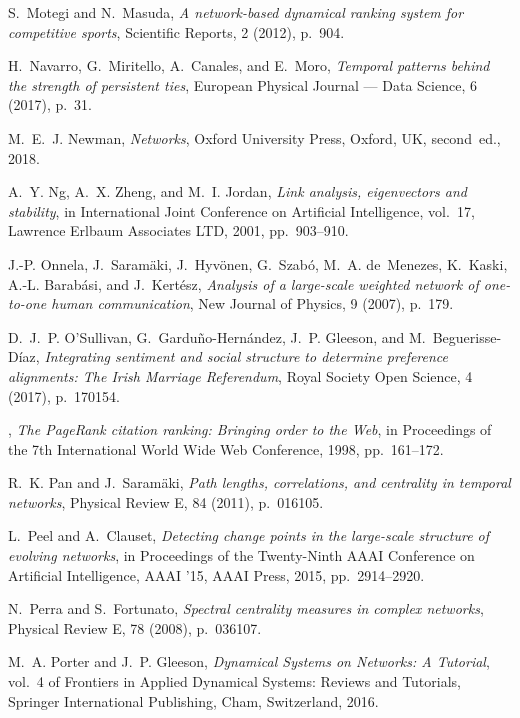\documentclass[journal,transmag]{IEEEtran}
\begin{document}
\begin{thebibliography}{10}
{\sc S.~Motegi and N.~Masuda}, {\em A network-based dynamical ranking system
  for competitive sports}, Scientific Reports, 2 (2012), p.~904.

{\sc H.~Navarro, G.~Miritello, A.~Canales, and E.~Moro}, {\em Temporal patterns
  behind the strength of persistent ties}, European Physical Journal --- Data
  Science, 6 (2017), p.~31.

{\sc M.~E.~J. Newman}, {\em Networks}, {Oxford University Press}, Oxford, UK,
  second~ed., 2018.

{\sc A.~Y. Ng, A.~X. Zheng, and M.~I. Jordan}, {\em Link analysis, eigenvectors
  and stability}, in International Joint Conference on Artificial Intelligence,
  vol.~17, Lawrence Erlbaum Associates LTD, 2001, pp.~903--910.

{\sc J.-P. Onnela, J.~Saram\"aki, J.~Hyv\"onen, G.~Szab\'o, M.~A. de~Menezes,
  K.~Kaski, A.-L. Barab\'asi, and J.~Kert\'esz}, {\em Analysis of a large-scale
  weighted network of one-to-one human communication}, New Journal of Physics,
  9 (2007), p.~179.

{\sc D.~J.~P. {O'Sullivan}, G.~{Gardu{\~n}o-Hern{\'a}ndez}, J.~P. {Gleeson},
  and M.~Beguerisse-D\'iaz}, {\em {Integrating sentiment and social structure
  to determine preference alignments: The Irish Marriage Referendum}}, Royal
  Society Open Science, 4 (2017), p.~170154.

{}, {\em The
  {PageRank} citation ranking: {B}ringing order to the {W}eb}, in Proceedings
  of the 7th International World Wide Web Conference, 1998, pp.~161--172.

{\sc R.~K. Pan and J.~Saram\"aki}, {\em Path lengths, correlations, and
  centrality in temporal networks}, Physical Review E, 84 (2011), p.~016105.

{\sc L.~Peel and A.~Clauset}, {\em Detecting change points in the large-scale
  structure of evolving networks}, in Proceedings of the Twenty-Ninth AAAI
  Conference on Artificial Intelligence, AAAI '15, AAAI Press, 2015,
  pp.~2914--2920.

{\sc N.~Perra and S.~Fortunato}, {\em Spectral centrality measures in complex
  networks}, Physical Review E, 78 (2008), p.~036107.

{\sc M.~A. Porter and J.~P. Gleeson}, {\em {Dynamical Systems on Networks: {A}
  Tutorial}}, vol.~4 of Frontiers in Applied Dynamical Systems: Reviews and
  Tutorials, Springer International Publishing, Cham, Switzerland, 2016.


\end{thebibliography}
\end{document}
